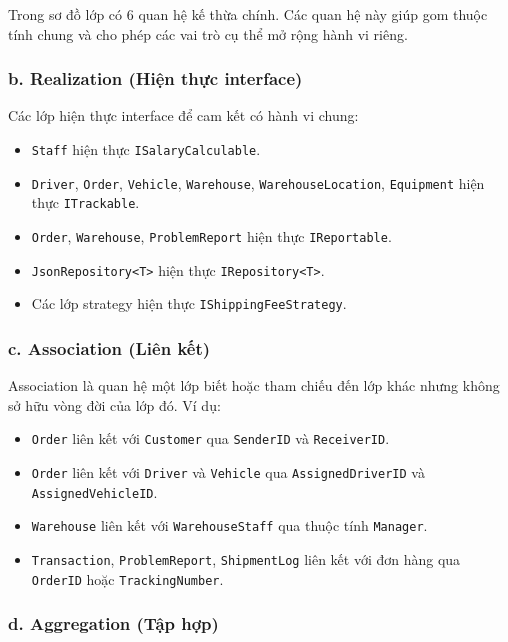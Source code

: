 \documentclass[12pt,a4paper]{article}
\begin{document}
Trong sơ đồ lớp có 6 quan hệ kế thừa chính. Các quan hệ này giúp gom thuộc tính chung và cho phép các vai trò cụ thể mở rộng hành vi riêng.

\subsubsection*{b. Realization (Hiện thực interface)}

Các lớp hiện thực interface để cam kết có hành vi chung:

\begin{itemize}[leftmargin=1.2cm]
    \item \texttt{Staff} hiện thực \texttt{ISalaryCalculable}.
    \item \texttt{Driver}, \texttt{Order}, \texttt{Vehicle}, \texttt{Warehouse}, \texttt{WarehouseLocation}, \texttt{Equipment} hiện thực \texttt{ITrackable}.
    \item \texttt{Order}, \texttt{Warehouse}, \texttt{ProblemReport} hiện thực \texttt{IReportable}.
    \item \texttt{JsonRepository<T>} hiện thực \texttt{IRepository<T>}.
    \item Các lớp strategy hiện thực \texttt{IShippingFeeStrategy}.
\end{itemize}

\subsubsection*{c. Association (Liên kết)}

Association là quan hệ một lớp biết hoặc tham chiếu đến lớp khác nhưng không sở hữu vòng đời của lớp đó. Ví dụ:

\begin{itemize}[leftmargin=1.2cm]
    \item \texttt{Order} liên kết với \texttt{Customer} qua \texttt{SenderID} và \texttt{ReceiverID}.
    \item \texttt{Order} liên kết với \texttt{Driver} và \texttt{Vehicle} qua \texttt{AssignedDriverID} và \texttt{AssignedVehicleID}.
    \item \texttt{Warehouse} liên kết với \texttt{WarehouseStaff} qua thuộc tính \texttt{Manager}.
    \item \texttt{Transaction}, \texttt{ProblemReport}, \texttt{ShipmentLog} liên kết với đơn hàng qua \texttt{OrderID} hoặc \texttt{TrackingNumber}.
\end{itemize}

\subsubsection*{d. Aggregation (Tập hợp)}
\end{document}

